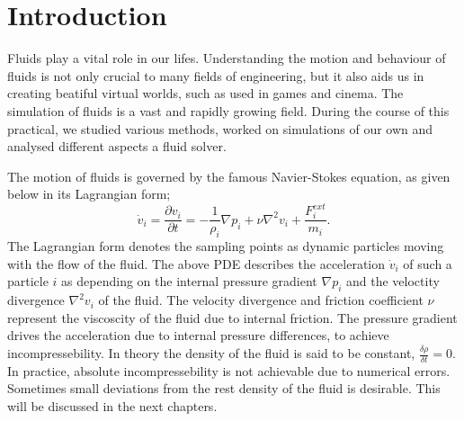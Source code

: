 \documentclass[11pt, letterpaper, twocolumn]{article}
\begin{document}




\section{Introduction} \label{sec:introduction}

Fluids play a vital role in our lifes. Understanding the motion and behaviour of fluids is not only crucial to many fields of engineering, but it also aids us in creating beatiful virtual worlds, such as used in games and cinema. The simulation of fluids is a vast and rapidly growing field. During the course of this practical, we studied various methods, worked on simulations of our own and analysed different aspects a fluid solver.  

The motion of fluids is governed by the famous Navier-Stokes equation, as given below in its Lagrangian form;
\begin{equation}
  \dot{v}_i = \frac{\partial v_i}{\partial t} = -\frac{1}{\rho_i}\nabla p_i +\nu \nabla^2 v_i + \frac{F^{ext}_i}{m_i}.
\end{equation}
The Lagrangian form denotes the sampling points as dynamic particles moving with the flow of the fluid. The above PDE describes the acceleration \( \dot{v}_i\) of such a particle \( i \) as depending on the internal pressure gradient \( \nabla p_i\) and the veloctity divergence \( \nabla^2 v_i\) of the fluid. The velocity divergence and friction coefficient \( \nu \) represent the viscoscity of the fluid due to internal friction. The pressure gradient drives the acceleration due to internal pressure differences, to achieve incompressebility. In theory the density of the fluid is said to be constant, 
\(\frac{\delta \rho}{\delta t} = 0.\)
In practice, absolute incompressebility is not achievable due to numerical errors. Sometimes small deviations from the rest density of the fluid is desirable. This will be discussed in the next chapters. \cite{bender2015, ihmsen2014}
\end{document}
